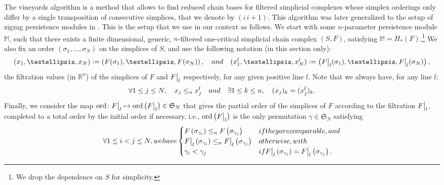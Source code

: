 \documentclass{article}
\newcommand{\simpcomp}{S}
\newcommand{\R}{\mathbb{R}}
\newcommand{\Mbb}{\mathbb{M}}
\newcommand{\leqn}{\leq_n}
\newcommand\restr[2]{{  \left.\kern-\nulldelimiterspace #1 \vphantom{\big|} \right|_{#2}  }}
\newcommand{\ordonly}[0]{\ensuremath{\mathrm{ord}}}
\newcommand{\ord}[1]{\ensuremath{\ordonly\left(#1\right)}}
\begin{document}
The vineyards algorithm \cite{cohen-steinerVinesVineyardsUpdating2006} is a
method that allows to find reduced chain bases for filtered simplicial complexes whose simplex orderings only differ by a single transposition of consecutive simplices,
that we denote by $(i\, i+1)$.
This algorithm was later generalized to the setup of zigzag persistence modules in \cite{mariaZigzagPersistenceReflections2015}. This is the setup that we use
in our context as follows.
We start with some $n$-parameter persistence module $\Mbb$, such that there
exists a finite dimensional, generic, $n$-filtered one-critical simplicial chain complex $(\simpcomp,F)$, satisfying $\Mbb=H_*(F)$.\footnote{We drop the dependence on $\simpcomp$ for simplicity.}
We also fix an order $(\sigma_1, \dots, \sigma_N)$ on the simplices of $\simpcomp$, and use the following notation (in this section only):
\begin{equation}\label{eq:vineyards_x_def}
	(x_1, \dots, x_N):= \left( F(\sigma_1), \dots, F(\sigma_N) \right), \quad \textnormal{and }\quad   (x_1^l,\dots,x_N^l) :=\left( \restr{F}{l}(\sigma_1), \dots, \restr{F}{l}(\sigma_N) \right),
\end{equation}
the filtration values (in $\R^n$) of the simplices of $F$ and $\restr F l$ respectively, for any given positive line $l$.
Note that we always have, for any line $l$:
\begin{equation}\label{eq:vineyards_line_proj}
	\forall 1\le j\le N,\quad x_j \leqn x_j^l\quad \textnormal{and} \quad\exists 1\le k \le n, \quad (x_j)_k = (x_j^l)_k.
\end{equation}
Finally, we consider the map $\ordonly \colon \restr F l \mapsto \ord{\restr F l }\in\mathfrak S_N$
that gives the partial order of the simplices of $F$ according to the
filtration $\restr F l$, completed to a total order by the initial order if necessary, i.e.,
$\ord{\restr F l}$ is the only permutation $\gamma\in \mathfrak S_N$  satisfying
\begin{equation}\label{eq:vineyards_ord_def}
	\forall 1\le i<j\le N,
	\textnormal{ we have }
	\begin{cases}
		F \left(\sigma_{\gamma_i}\right)
		\leqn
		F  \left(\sigma_{\gamma_j}\right)
		& \textnormal{ if they are comparable, and}                     \\
		\restr F l \left(\sigma_{\gamma_i}\right)
		\leqn
		\restr F l \left(\sigma_{\gamma_j}\right)
		& \textnormal{  otherwise,}
		\textnormal{ with }
		\\
		\gamma_i
		< \gamma_j
		& \textnormal{ if } \restr{F}{l} \left(\sigma_{\gamma_i}\right)
		=
		\restr F l \left(\sigma_{\gamma_j}\right).
	\end{cases}
\end{equation}
\end{document}
